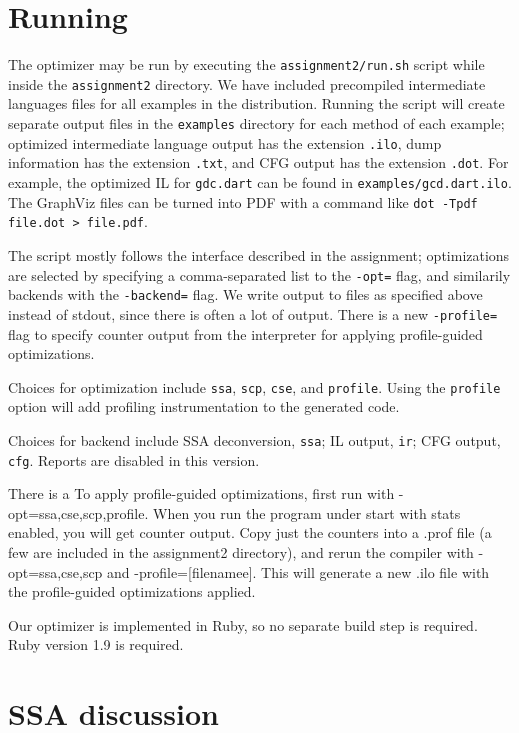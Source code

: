 \documentclass[10pt,twocolumn]{article}
\begin{document}
\section{Running}

The optimizer may be run by executing the \texttt{assignment2/run.sh}
script while inside the \texttt{assignment2} directory. We have
included precompiled intermediate languages files for all examples in
the distribution. Running the script will create separate output files
in the \texttt{examples} directory for each method of each example;
optimized intermediate language output has the extension
\texttt{.ilo}, dump information has the extension \texttt{.txt}, and
CFG output has the extension \texttt{.dot}. For example, the optimized
IL for \texttt{gdc.dart} can be found in
\texttt{examples/gcd.dart.ilo}. The GraphViz files can be turned into
PDF with a command like \texttt{dot -Tpdf file.dot > file.pdf}.

The script mostly follows the interface described in the assignment;
optimizations are selected by specifying a comma-separated list to the
\texttt{-opt=} flag, and similarily backends with the
\texttt{-backend=} flag. We write output to files as specified above
instead of stdout, since there is often a lot of output. There is a
new \texttt{-profile=} flag to specify counter output from the
interpreter for applying profile-guided optimizations.

Choices for optimization include \texttt{ssa}, \texttt{scp},
\texttt{cse}, and \texttt{profile}. Using the \texttt{profile} option
will add profiling instrumentation to the generated code.

Choices for backend include SSA deconversion, \texttt{ssa}; IL output,
\texttt{ir}; CFG output, \texttt{cfg}. Reports are disabled in this
version.


There is a To apply profile-guided optimizations, first run with
-opt=ssa,cse,scp,profile. When you run the program under start with
stats enabled, you will get counter output. Copy just the counters
into a .prof file (a few are included in the assignment2 directory),
and rerun the compiler with -opt=ssa,cse,scp and
-profile=[filenamee]. This will generate a new .ilo file with the
profile-guided optimizations applied.

Our optimizer is implemented in Ruby, so no separate build step is
required. Ruby version 1.9 is required. 

\section{SSA discussion}
\end{document}
